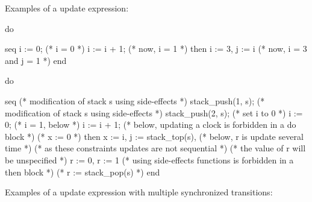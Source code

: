 Examples of a  update expression:

\begin{IMITATORmodel}
	do {

		seq
			i := 0; (* i = 0 *)
			i := i + 1; (* now, i = 1 *)
		then
			i := 3, j := i (* now, i = 3 and j = 1 *)
		end

	}
\end{IMITATORmodel}

\begin{IMITATORmodel}
	do {

		seq
			(* modification of stack s using side-effects *)
			stack_push(1, s);
			(* modification of stack s using side-effects *)
			stack_push(2, s);
			(* set i to 0 *)
			i := 0;
			(* i = 1, below *)
			i := i + 1;
			(* below, updating a clock is forbidden in a do block *)
			(* x := 0 *)
		then
			x := i,
			j := stack_top(s),
			(* below, r is update several time *)
			(* as these constraints updates are not sequential *)
			(* the value of r will be unspecified *)
			r := 0,
			r := 1
			(* using side-effects functions is forbidden in a then block *)
			(* r := stack_pop(s) *)
		end

	}
\end{IMITATORmodel}

Examples of a  update expression with multiple synchronized transitions:

